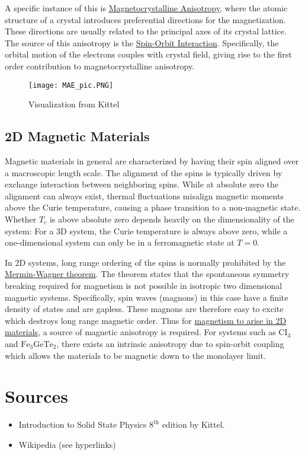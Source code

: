 \documentclass[12pt]{article}
\begin{document}
A specific instance of this is \href{https://en.wikipedia.org/wiki/Magnetocrystalline_anisotropy}{Magnetocrystalline Anisotropy}, where the atomic structure of a crystal introduces preferential directions for the magnetization. These directions are usually related to the principal axes of its crystal lattice. The source of this anisotropy is the \href{https://en.wikipedia.org/wiki/Spin\%E2\%80\%93orbit_interaction}{Spin-Orbit Interaction}. Specifically, the orbital motion of the electrons couples with crystal field,  giving rise to the first order contribution to magnetocrystalline anisotropy. 
\begin{figure}
    \centering
    \texttt{[image: MAE\_pic.PNG]}
    \caption{Visualization from Kittel}
    \label{fig:MAE}
\end{figure}
\subsection{2D Magnetic Materials}
Magnetic materials in general are characterized by having their spin aligned over a macroscopic length scale. The alignment of the spins is typically driven by exchange interaction between neighboring spins. While at absolute zero the alignment can always exist, thermal fluctuations misalign magnetic moments above the Curie temperature, causing a phase transition to a non-magnetic state. Whether $T_c$ is above absolute zero depends heavily on the dimensionality of the system: For a 3D system, the Curie temperature is always above zero, while a one-dimensional system can only be in a ferromagnetic state at $T=0$. 

In 2D systems, long range ordering of the spins is normally prohibited by the \href{https://en.wikipedia.org/wiki/Mermin\%E2\%80\%93Wagner_theorem}{Mermin-Wagner theorem}. The theorem states that the spontaneous symmetry breaking required for magnetism is not possible in isotropic two dimensional magnetic systems. Specifically, spin waves (magnons) in this case have a finite density of states and are gapless. These magnons are therefore easy to excite which destroys long range magnetic order. Thus for  \href{https://en.wikipedia.org/wiki/Magnetic_2D_materials}{magnetism to arise in 2D materials}, a source of magnetic anisotropy is required. For systems such as $\mathrm{CI}_3$ and $\mathrm{Fe}_3\mathrm{GeTe}_2$, there exists an intrinsic anisotropy due to spin-orbit coupling which allows the materials to be magnetic down to the monolayer limit. 

\section*{Sources}
\begin{itemize}
    \item Introduction to Solid State Physics $8^{\mathrm{th}}$ edition by Kittel.
    \item Wikipedia (see hyperlinks) 
\end{itemize}
\end{document}
